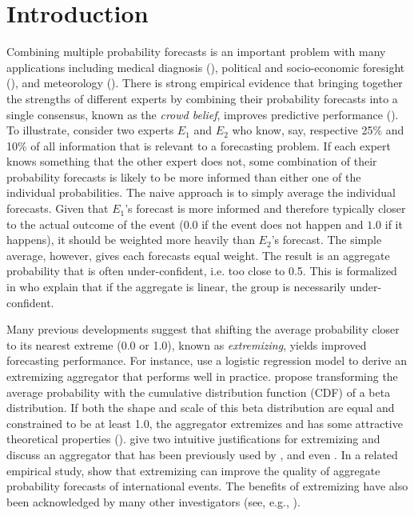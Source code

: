 \documentclass[11pt]{article}
\theoremstyle{definition}
\theoremstyle{definition}
\begin{document}
\section{Introduction}
Combining multiple probability forecasts is an important problem with many applications including medical diagnosis (\cite{wilson1998prediction, pepe2003statistical}), political and socio-economic foresight (\cite{tetlock2005expert}), and meteorology (\cite{sanders1963subjective, vislocky1995improved, baars2005performance}). There is strong empirical evidence that bringing together the strengths of different experts by combining their probability forecasts into a single consensus, known as the \textit{crowd belief},  improves predictive performance (\cite{clemen1989combining, armstrong2001combining}). To illustrate, consider two experts $E_1$ and $E_2$ who know, say, respective 25\% and 10\% of all information that is relevant to a forecasting problem. If each expert knows something that the other expert does not, some combination of their probability forecasts is likely to be more informed than either one of the individual probabilities. The naive approach is to simply average the individual forecasts.  Given that $E_1$'s forecast is more informed and therefore typically closer to the actual outcome of the event ($0.0$ if the event does not happen and $1.0$ if it happens), it should be weighted more heavily than $E_2$'s forecast. The simple average, however, gives each forecasts equal weight. The result is an aggregate probability that is often under-confident, i.e. too close to 0.5. This is formalized in \cite{Ranjan08} who explain that if the aggregate is linear, the group is necessarily under-confident.


Many previous developments suggest that shifting the average probability closer to its nearest extreme (0.0 or 1.0), known as \textit{extremizing}, yields improved forecasting performance. For instance, \cite{satopaa} use a logistic regression model to derive an extremizing aggregator that performs well in practice. \cite{Ranjan08} propose transforming the average probability with the cumulative distribution function (CDF) of a beta distribution. If both the shape and scale of this beta distribution are equal and constrained to be at least 1.0,  the aggregator extremizes and has some attractive theoretical properties (\cite{Wallsten2001}).  \cite{Baron} give two intuitive justifications for extremizing and discuss an aggregator that has been previously used by \cite{Erev1994, shlomi2010subjective}, and even \cite{karmarkar1978subjectively}. In a related empirical study, \cite{mellers} show that extremizing can improve the quality of aggregate probability forecasts of international events. The benefits of extremizing have also been acknowledged by many other investigators (see, e.g., \cite{turner2013forecast, Ariely00theeffects}).
\end{document}
